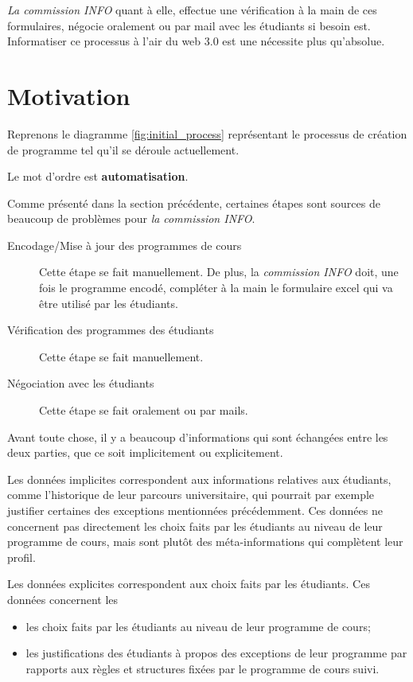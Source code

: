 \textit{La commission INFO} quant à elle, effectue une vérification à la main de ces formulaires, négocie oralement ou par mail avec les étudiants si besoin est. 
Informatiser ce processus à l'air du web 3.0 est une nécessite plus qu'absolue.



\section{Motivation}
Reprenons le diagramme \ref{fig:initial_process} représentant le processus de création de programme tel qu'il se déroule actuellement. 

Le mot d'ordre est \textbf{automatisation}.

Comme présenté dans la section précédente, certaines étapes sont sources de beaucoup de problèmes pour \textit{la commission INFO}.

\begin{description}
  \item[Encodage/Mise à jour des programmes de cours] Cette étape se fait manuellement. De plus, la \textit{ commission INFO} doit, une fois le programme encodé, compléter à la main le formulaire excel qui va être utilisé par les étudiants. 
  \item[Vérification des programmes des étudiants]  Cette étape se fait manuellement. 
  \item[Négociation avec les étudiants] Cette étape se fait oralement ou par mails.
\end{description} 

Avant toute chose, il y a beaucoup d'informations qui sont échangées entre les deux parties, que ce soit implicitement ou explicitement.

Les données implicites correspondent aux informations relatives aux étudiants, comme l'historique de leur parcours universitaire, qui pourrait par exemple justifier certaines des exceptions mentionnées précédemment. Ces données ne concernent pas directement les choix faits par les étudiants au niveau de leur programme de cours, mais sont plutôt des méta-informations qui complètent leur profil. 

Les données explicites correspondent aux choix faits par les étudiants. Ces données concernent les
\begin{itemize}
\item les choix faits par les étudiants au niveau de leur programme de cours;
\item les justifications des étudiants à propos des exceptions de leur programme par rapports aux règles et structures fixées par le programme de cours suivi. 
\end{itemize}

